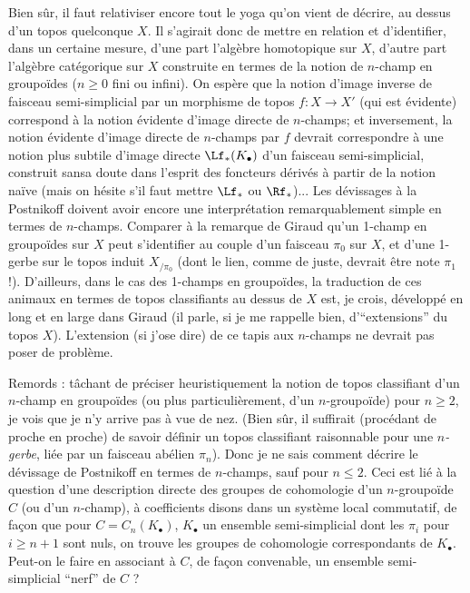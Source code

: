 \label{sec:app4}%
Bien sûr, il faut relativiser encore tout le yoga qu'on vient de décrire, au dessus d'un topos quelconque $X$. Il s'agirait donc de mettre en relation et d'identifier, dans un certaine mesure, d'une part l'algèbre homotopique sur $X$, d'autre part l'algèbre catégorique sur $X$ construite en termes de la notion de $n$-champ en groupoïdes ($n \geq 0$ fini ou infini). On espère que la notion d'image inverse de faisceau semi-simplicial par un morphisme de topos $f: X \to X'$ (qui est évidente) correspond à la notion évidente d'image directe de $n$-champs; et inversement, la notion évidente d'image directe de $n$-champs par $f$ devrait correspondre à une notion plus subtile d'image directe $\Lf_* (K_\bullet)$ d'un faisceau semi-simplicial, construit sansa doute dans l'esprit des foncteurs dérivés à partir de la notion naïve (mais on hésite s'il faut mettre $\Lf_*$ ou $\Rf_*$)... Les dévissages à la Postnikoff doivent avoir encore une interprétation remarquablement simple en termes de $n$-champs. Comparer à la remarque de Giraud qu'un 1-champ en groupoïdes sur $X$ peut s'identifier au couple d'un faisceau $\pi_0$ sur $X$, et d'une 1-gerbe sur le topos induit $X_{/\pi_0}$ (dont le lien, comme de juste, devrait être note $\pi_1$ !). D'ailleurs, dans le cas des 1-champs en groupoïdes, la traduction de ces animaux en termes de topos classifiants au dessus de $X$ est, je crois, développé en long et en large dans Giraud (il parle, si je me rappelle bien, d'``extensions'' du topos $X$). L'extension (si j'ose dire) de ce tapis aux $n$-champs ne devrait pas poser de problème.

Remords : tâchant de préciser heuristiquement la notion de topos classifiant d'un $n$-champ en groupoïdes (ou plus particulièrement, d'un $n$-groupoïde) pour $n \geq 2$, je vois que je n'y arrive pas à vue de nez. (Bien sûr, il suffirait (procédant de proche en proche) de savoir définir un topos classifiant raisonnable pour une \emph{$n$-gerbe}, liée par un faisceau abélien $\pi_n$). Donc je ne sais comment décrire le dévissage de Postnikoff en termes de $n$-champs, sauf pour $n \leq 2$. Ceci est lié à la question d'une description directe des groupes de cohomologie d'un $n$-groupoïde $C$ (ou d'un $n$-champ), à coefficients disons dans un système local commutatif, de fa\c{c}on que pour $C = C_n(K_\bullet)$, $K_\bullet$ un ensemble semi-simplicial dont les $\pi_i$ pour $i \geq n + 1$ sont nuls, on trouve les groupes de cohomologie correspondants de $K_\bullet$. Peut-on le faire en associant à $C$, de fa\c{c}on convenable, un ensemble semi-simplicial ``nerf'' de $C$ ?

